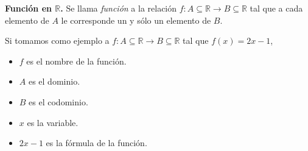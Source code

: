 \begin{definition}\textbf{Función en $\mathbb{R}$.}
    Se llama \textit{función} a la relación $f: A \subseteq \mathbb{R} \rightarrow B \subseteq \mathbb{R}$ tal que a cada elemento de
    $A$ le corresponde un y s\'olo un elemento de $B$.
\end{definition}

\begin{example}
    Si tomamos como ejemplo a $f: A \subseteq \mathbb{R} \rightarrow B \subseteq \mathbb{R}$ tal que $f(x)=2x-1$,
    \begin{itemize}
        \item $f$ es el nombre de la función.
        \item $A$ es el dominio.
        \item $B$ es el codominio.
        \item $x$ es la variable.
        \item $2x-1$ es la fórmula de la función.
    \end{itemize}
\end{example}


